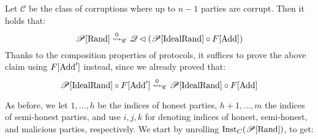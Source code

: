 \begin{claim}
    Let $\mathscr{C}$ be the class of corruptions where up to $n - 1$ parties
    are corrupt.
    Then it holds that:
    $$
    \mathscr{P}[\text{Rand}] \overset{0}{\leadsto}_{\mathscr{C}} \mathscr{Q} \lhd (\mathscr{P}[\text{IdealRand}] \circ F[\text{Add}])
    $$
     Thanks to the composition properties of protocols, it suffices to prove the above claim using $F[\text{Add}']$ instead,
    since we already proved that:
    $$
    \mathscr{P}[\text{IdealRand}] \circ F[\text{Add}'] \overset{0}{\leadsto}_{\mathscr{C}}
    \mathscr{P}[\text{IdealRand}] \circ F[\text{Add}]
    $$

    As before, we let $1, \ldots, h$ be the indices of honest parties,
    $h + 1, \ldots, m$ the indices of semi-honest parties,
    and use $i, j, k$ for denoting indices of honest, semi-honest, and malicious
    parties, respectively.
    We start by unrolling $\text{Inst}_C(\mathscr{P}[\text{Rand}])$, to get:
    


\end{claim}
